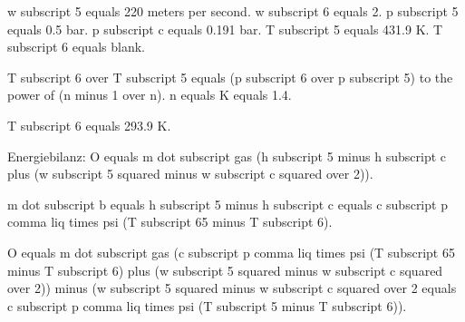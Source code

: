 w subscript 5 equals 220 meters per second.  
w subscript 6 equals 2.  
p subscript 5 equals 0.5 bar.  
p subscript c equals 0.191 bar.  
T subscript 5 equals 431.9 K.  
T subscript 6 equals blank.

T subscript 6 over T subscript 5 equals (p subscript 6 over p subscript 5) to the power of (n minus 1 over n).  
n equals K equals 1.4.

T subscript 6 equals 293.9 K.

Energiebilanz:  
O equals m dot subscript gas (h subscript 5 minus h subscript c plus (w subscript 5 squared minus w subscript c squared over 2)).  

m dot subscript b equals h subscript 5 minus h subscript c equals c subscript p comma liq times psi (T subscript 65 minus T subscript 6).  

O equals m dot subscript gas (c subscript p comma liq times psi (T subscript 65 minus T subscript 6) plus (w subscript 5 squared minus w subscript c squared over 2)) minus (w subscript 5 squared minus w subscript c squared over 2 equals c subscript p comma liq times psi (T subscript 5 minus T subscript 6)).
